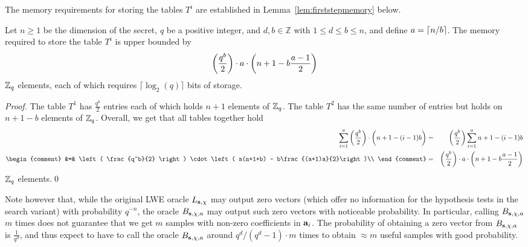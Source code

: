 The memory requirements for storing the tables $T^i$ are established in Lemma~\ref{lem:firststepmemory} below.

\begin{lemma}
\label{lem:firststepmemory}
Let $n\ge 1$ be the dimension of the secret, $q$ be a positive integer, and $d,b \in \mathbb{Z}$ with $1 \le d \leq b \le n$, and define $a = \lceil n/b \rceil$. The memory required to store the table $T^i$ is upper bounded by 
\begin{equation*}
\left( \frac{q^b}{2} \right) \cdot a\cdot \left(n+1 - b\frac{a-1}{2}\right)
\end{equation*}
$\mathbb{Z}_q$ elements, each of which requires $\lceil\log_2(q)\rceil$ bits of storage.
\end{lemma}

\begin{proof}
The table $T^1$ has $\frac{q^b}{2}$ entries each of which holds $n+1$ elements of $\mathbb{Z}_q$. The table $T^2$ has the same number of entries but holds on $n+1-b$ elements of $\mathbb{Z}_q$. Overall, we get that all tables together hold
\begin{eqnarray*}
\sum_{i=1}^{a} \left( \frac{q^b}{2} \right) \cdot \bigg(n+1 - (i-1)b\bigg) &=& \left( \frac{q^b}{2} \right) \sum_{i=1}^{a} n+1 - (i-1)b\\
\begin{comment}
 &=& \left( \frac{q^b}{2} \right) \cdot \left( a(n+1+b) - b\frac{(a+1)a}{2}\right)\\
\end{comment}
 &=& \left( \frac{q^b}{2} \right) \cdot a\cdot \left(n+1 - b\frac{a-1}{2}\right)\\
\end{eqnarray*}
$\mathbb{Z}_q$ elements.\qed
\end{proof}
Note however that, while the original LWE oracle $L_{\mathbf{s},\chi}$ may output zero vectors (which offer no information for the hypothesis tests in the search variant) with probability $q^{-n}$, the oracle $B_{\mathbf{s},\chi,a}$ may output such zero vectors with noticeable probability. In particular, calling $B_{\mathbf{s},\chi,a}$ $m$ times does not guarantee that we get $m$ samples with non-zero coefficients in $\mathbf{a}_i$. The  probability of obtaining a zero vector from $B_{\mathbf{s},\chi,a}$ is $\frac{1}{q^d}$, and thus expect to have to call the oracle $B_{\mathbf{s},\chi,a}$ around ${q^d}/{(q^d-1)} \cdot m$ times to obtain $\approx m$ useful samples with good probability.

